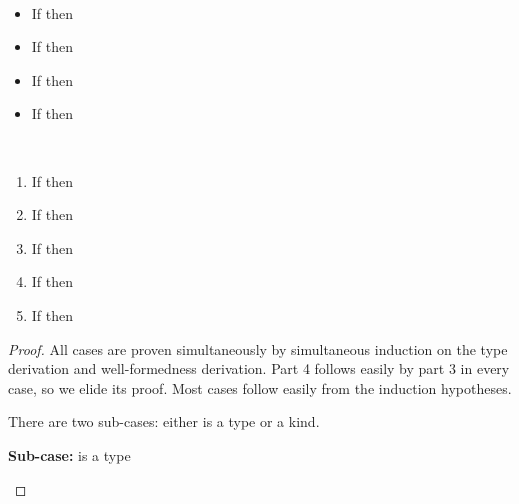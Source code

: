{\begin{lemma}
  \label{lem:cps:cbv:pres-equiv}
  ~
  \begin{multicols}{2}
  \begin{itemize}
    \item If \im{\se \equiv \sepr} then \im{\se^{\div} \equiv \se^{\sprime\div}}
    \item If \im{\sA \equiv \sApr} then \im{\sA^{+} \equiv \sA^{\sprime+}}
    \item If \im{\sA \equiv \sApr} then \im{\sA^{\div} \equiv \sA^{\sprime\div}}
    \item If \im{\sK \equiv \sKpr} then \im{\sK^{+} \equiv \sK^{\sprime+}}
  \end{itemize}
  \end{multicols}
\end{lemma}
%
\begin{lemma}
  \label{lem:cps:cbv:type-pres}
  ~
  \begin{enumerate}
  \item If \im{\swf{\slenv}} then \im{\cpswf{\slenv^{+}}}
  \item If \im{\styjudg{\slenv}{\se}{\sA}} then
    \im{\styjudg{\slenv^{+}}{\se^{\div}}{\sA^{\div}}}
  \item If \im{\styjudg{\slenv}{\sA}{\sK}} then
    \im{\cpstyjudg{\slenv^{+}}{\sA^{+}}{\sK^+}}
  \item If \im{\styjudg{\slenv}{\sA}{\sstarty}} then
    \im{\styjudg{\slenv^{+}}{\sA^{\div}}{\sstarty^+}}
  \item If \im{\styjudg{\slenv}{\sK}{\sU}} then
    \im{\cpstyjudg{\slenv^{+}}{\sK^{+}}{\sU^+}}
  \end{enumerate}
\end{lemma}
\begin{proof}
  All cases are proven simultaneously by simultaneous induction on the type
  derivation and well-formedness derivation.
  Part 4 follows easily by part 3 in every case, so we elide its proof.
  Most cases follow easily from the induction hypotheses.
  \begin{proofcases}
  \item {} \im{\swf{\slenv,\sx:\sA}}

    There are two sub-cases: either \im{\sA} is a type or a kind.

    \item[{\bfseries Sub-case:}] \im{\sA} is a type


\end{proofcases}
\end{proof}}
